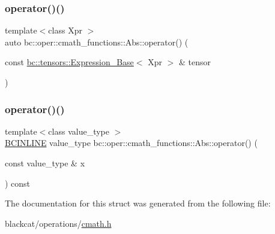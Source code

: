 \mbox{\label{structbc_1_1oper_1_1cmath__functions_1_1Abs_a8e80dd442d6f575cc5cfe314b80b807c}} 
\subsubsection{\texorpdfstring{operator()()}{operator()()}\hspace{0.1cm}{\footnotesize\ttfamily [2/3]}}
{\footnotesize\ttfamily template$<$class Xpr $>$ \\
auto bc\+::oper\+::cmath\+\_\+functions\+::\+Abs\+::operator() (\begin{DoxyParamCaption}\item[{const \hyperlink{classbc_1_1tensors_1_1Expression__Base}{bc\+::tensors\+::\+Expression\+\_\+\+Base}$<$ Xpr $>$ \&}]{tensor }\end{DoxyParamCaption})\hspace{0.3cm}{\ttfamily [inline]}}

\mbox{\label{structbc_1_1oper_1_1cmath__functions_1_1Abs_a49b7bfa11dca0903af5c8c221a58e857}} 
\subsubsection{\texorpdfstring{operator()()}{operator()()}\hspace{0.1cm}{\footnotesize\ttfamily [3/3]}}
{\footnotesize\ttfamily template$<$class value\+\_\+type $>$ \\
\hyperlink{common_8h_a6699e8b0449da5c0fafb878e59c1d4b1}{B\+C\+I\+N\+L\+I\+NE} value\+\_\+type bc\+::oper\+::cmath\+\_\+functions\+::\+Abs\+::operator() (\begin{DoxyParamCaption}\item[{const value\+\_\+type \&}]{x }\end{DoxyParamCaption}) const\hspace{0.3cm}{\ttfamily [inline]}}



The documentation for this struct was generated from the following file\+:\begin{DoxyCompactItemize}
\item 
blackcat/operations/\hyperlink{cmath_8h}{cmath.\+h}\end{DoxyCompactItemize}
